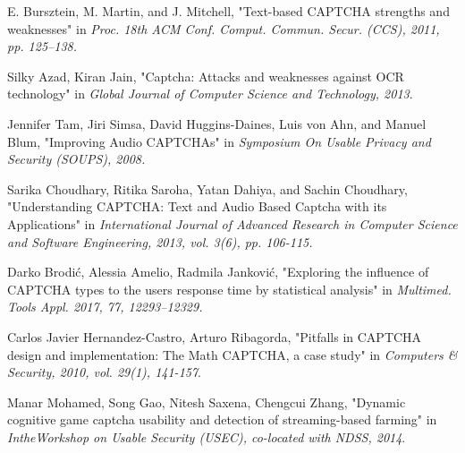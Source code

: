 \begin{thebibliography}{9}
 E. Bursztein, M. Martin, and J. Mitchell, "Text-based CAPTCHA strengths and weaknesses" in \emph{Proc. 18th ACM Conf. Comput. Commun. Secur. (CCS), 2011, pp. 125–138.}

 Silky Azad, Kiran Jain, "Captcha: Attacks and weaknesses against OCR technology" in \emph{Global Journal of Computer Science and Technology, 2013}.

 Jennifer Tam, Jiri Simsa, David Huggins-Daines, Luis von Ahn, and Manuel Blum, "Improving Audio CAPTCHAs" in \emph{Symposium On Usable Privacy and Security (SOUPS), 2008.}

 Sarika Choudhary, Ritika Saroha, Yatan Dahiya, and Sachin Choudhary, "Understanding CAPTCHA: Text and Audio Based Captcha with its Applications" in \emph{International Journal of Advanced Research in Computer Science and Software Engineering, 2013, vol. 3(6), pp. 106-115.}

 Darko Brodi\'c, Alessia Amelio, Radmila Jankovi\'c, "Exploring the influence of CAPTCHA types to the users response time by statistical analysis" in \emph{Multimed. Tools Appl. 2017, 77, 12293–12329.}

 Carlos Javier Hernandez-Castro, Arturo Ribagorda, "Pitfalls in CAPTCHA design and implementation: The Math CAPTCHA, a case study" in \emph{Computers \& Security, 2010, vol. 29(1), 141-157}.

 Manar Mohamed, Song Gao, Nitesh Saxena, Chengcui Zhang,  "Dynamic cognitive  game  captcha  usability  and  detection  of  streaming-based  farming" in \emph{IntheWorkshop on Usable Security (USEC), co-located with NDSS, 2014}.

\end{thebibliography}